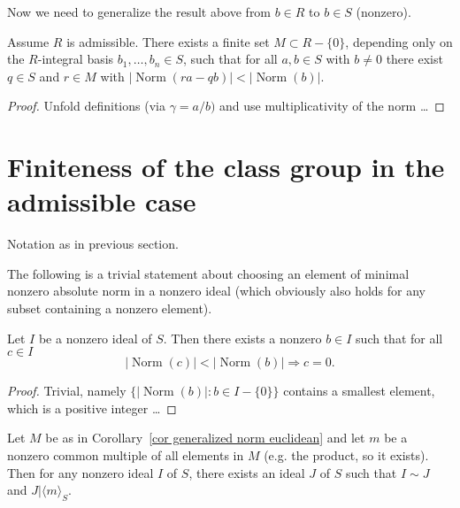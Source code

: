 \documentclass{amsart}
\newcommand{\NN}{\operatorname{Norm}}
\begin{document}
Now we need to generalize the result above from $b \in R$ to $b \in S$ (nonzero).

\begin{corollary}\label{cor generalized norm euclidean}
Assume $R$ is admissible.
There exists a finite set $M \subset R-\{0\}$, depending only on the $R$-integral basis $b_1,\ldots,b_n \in S$, such that
for all $a, b \in S$ with $b \not=0$ there exist $q \in S$ and $r \in M$ with $|\NN(ra-qb)| < |\NN(b)|$.
\end{corollary}

\begin{proof}
Unfold definitions (via $\gamma=a/b)$ and use multiplicativity of the norm \ldots
\end{proof}



\section{Finiteness of the class group in the admissible case}

Notation as in previous section.

The following is a trivial statement about choosing an element of minimal nonzero absolute norm in a nonzero ideal (which obviously also holds for any subset containing a nonzero element).
\begin{lemma}\label{lem element of nonzero minimal norm}
Let $I$ be a nonzero ideal of $S$. Then there exists a nonzero $b \in I$ such that for all $c \in I$
\begin{equation}\label{eqn element of nonzero minimal norm}
|\NN(c)| < |\NN(b)| \Rightarrow c=0.
\end{equation}
\end{lemma}

\begin{proof}
Trivial, namely $\{|\NN(b)| : b \in I-\{0\} \}$ contains a smallest element, which is a positive integer \ldots
\end{proof}

\begin{theorem}
Let $M$ be as in Corollary~\ref{cor generalized norm euclidean} and let $m$ be a nonzero common multiple of all elements in $M$ (e.g. the product, so it exists).
Then for any nonzero ideal $I$ of $S$, there exists an ideal $J$ of $S$ such that $I \sim J$ and $J | \langle m \rangle_S$.
\end{theorem}
\end{document}
